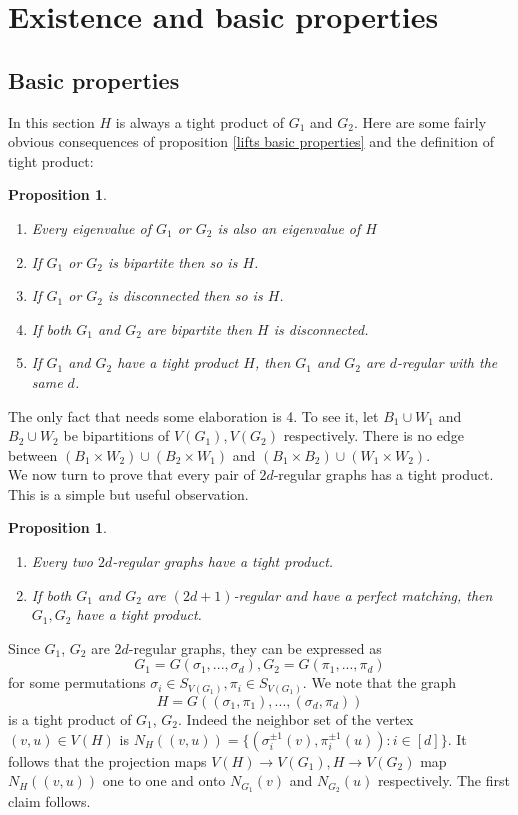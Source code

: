 \documentclass[12pt]{article}
\newtheorem{proposition}[theorem]{Proposition}
\newtheorem{open question}[theorem]{Open question}
\newcommand{\proof}{{\par\noindent {\bf Proof}\space\space}}
\begin{document}
\section{Existence and basic properties}\label{se:existence and basic properties}

 
\subsection{Basic properties}\label{se:basic properties}
In this section $H$ is always a tight product of $G_1$ and $G_2$. Here are some fairly obvious
consequences of proposition \ref{lifts basic properties} and the definition of tight product:

\begin{proposition}
\
\begin{enumerate}\label{pro:basic properties}
\item Every eigenvalue of $G_1$ or $G_2$ is also an eigenvalue of $H$
\item If $G_1$ or $G_2$ is bipartite then so is $H$.
\item If $G_1$ or $G_2$ is disconnected then so is $H$.
\item If both $G_1$ and $G_2$ are bipartite then $H$ is disconnected. 
\item If $G_1$ and $G_2$ have a tight product $H$, then $G_1$ and $G_2$ are $d$-regular with 
the same $d$.
\end{enumerate}
\end{proposition}
The only fact that needs some elaboration is 4. To see it,
let $B_1 \cup W_1$ and $B_2 \cup W_2$  be bipartitions of $V(G_1),V(G_2)$ respectively. There is no edge
between $(B_1\times W_2)\cup (B_2\times W_1)$ and $(B_1\times B_2)\cup (W_1\times W_2)$.\\

We now turn to prove that every pair of $2d$-regular graphs
has a tight product. This is a simple but useful observation.

\begin{proposition} \label{existence-basic}
\begin{enumerate}
\item Every two $2d$-regular graphs have a tight product. \label{2d-existence}
\item If both $G_1$ and $G_2$ are $(2d+1)$-regular and have a perfect matching,
then $G_1, G_2$ have a tight product. \label{2d+1-existence}
\end{enumerate}
\end{proposition}
\proof
Since $G_1$, $G_2$ are $2d$-regular graphs, they can be expressed as
$$G_1=G(\sigma_1,...,\sigma_d), G_2=G(\pi_1,...,\pi_d)$$
for some permutations $\sigma_i\in S_{V(G_1)},\pi_i\in S_{V(G_1)}$. We note that the graph
$$H=G((\sigma_1,\pi_1),...,(\sigma_d,\pi_d))$$
is a tight product of $G_1$, $G_2$. Indeed the neighbor set of the vertex
$(v,u)\in V(H)$ is $N_H((v,u))=\{(\sigma_i^{\pm 1}(v),\pi_i^{\pm 1}(u)):i\in [d]\}$.
It follows that the projection maps $V(H) \rightarrow V(G_1),H \rightarrow V(G_2)$ map $N_H((v,u))$ 
one to one and onto $N_{G_1}(v)$ and $N_{G_2}(u)$ respectively. 
The first claim follows.
\end{document}
